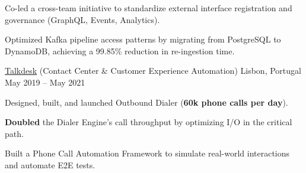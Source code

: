 \begin{cventries}
{\begin{cvitems}
      \item Co-led a cross-team initiative to standardize external interface registration and governance (GraphQL, Events, Analytics).
      \item Optimized Kafka pipeline access patterns by migrating from PostgreSQL to DynamoDB, achieving a 99.85\% reduction in re-ingestion time.  %
    \end{cvitems}
  }


    {\href{https://www.talkdesk.com/}{Talkdesk} (Contact Center \& Customer Experience Automation)}
    {Lisbon, Portugal}
    {May 2019 – May 2021}
    {
      \begin{cvitems}
        \item Designed, built, and launched Outbound Dialer (\textbf{60k phone calls per day}).
        \item \textbf{Doubled} the Dialer Engine's call throughput by optimizing I/O in the critical path.
        \item Built a Phone Call Automation Framework to simulate real-world interactions and automate E2E tests.
      \end{cvitems}
    }



\end{cventries}
